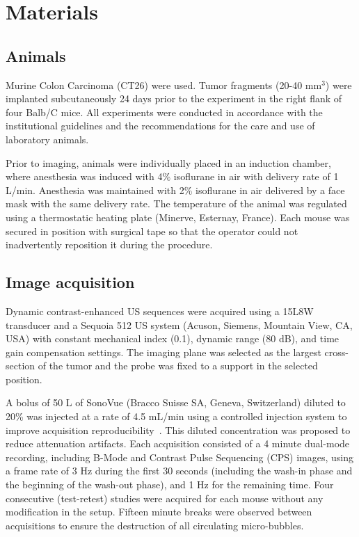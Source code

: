 \section{Materials}

\subsection{Animals}
Murine Colon Carcinoma (CT26) were used. Tumor fragments (20-40 mm$^3$) were implanted subcutaneously 24 days prior to the experiment in the right flank of four Balb/C mice. All experiments were conducted in accordance with the institutional guidelines and the recommendations for the care and use of laboratory animals. 

Prior to imaging, animals were individually placed in an induction chamber, where anesthesia was induced with 4\% isoflurane in air with delivery rate of 1 L/min. 
Anesthesia was maintained with 2\% isoflurane in air delivered by a face mask with the same delivery rate. 
The temperature of the animal was regulated using a thermostatic heating plate (Minerve, Esternay, France). Each mouse was secured in position with surgical tape so that the operator could not inadvertently reposition it during the procedure. 


\subsection{Image acquisition}
Dynamic contrast-enhanced US sequences were acquired using a 15L8W transducer and a Sequoia 512 US system (Acuson, Siemens, Mountain View, CA, USA) with constant mechanical index (0.1), dynamic range (80 dB), and time gain compensation settings.
The imaging plane was selected as the largest cross-section of the tumor and the probe was fixed to a support in the selected position.

A bolus of 50 \textmu L of SonoVue (Bracco Suisse SA, Geneva, Switzerland) diluted to 20\% was injected at a rate of 4.5 mL/min using a controlled injection system to improve acquisition reproducibility~\cite{Dizeux2016cd}. This diluted concentration was proposed to reduce attenuation artifacts. Each acquisition consisted of a 4 minute dual-mode recording, including B-Mode and Contrast Pulse Sequencing (CPS) images, using a frame rate of 3 Hz during the first 30 seconds (including the wash-in phase and the beginning of the wash-out phase), and 1 Hz for the remaining time. Four consecutive (test-retest) studies were acquired for each mouse without any modification in the setup. Fifteen minute breaks were observed between acquisitions to ensure the destruction of all circulating micro-bubbles.

